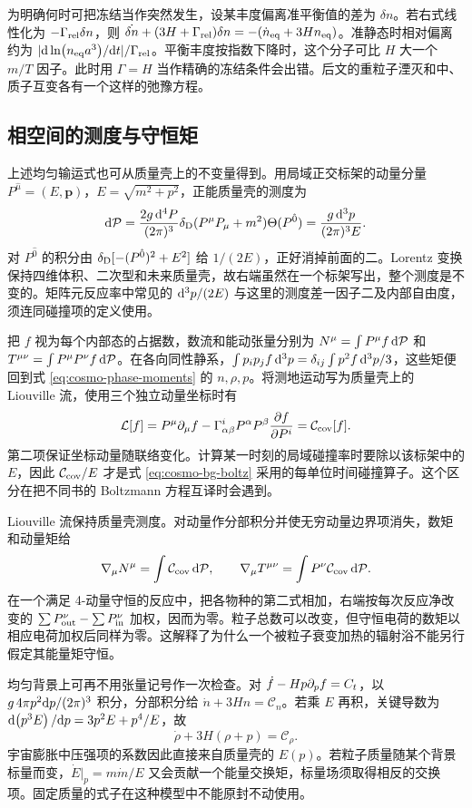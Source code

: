 为明确何时可把冻结当作突然发生，设某丰度偏离准平衡值的差为 $\delta n$。若右式线性化为 $-\Gamma_{\rm rel}\delta n$，则 $\dot{\delta n}+(3H+\Gamma_{\rm rel})\delta n=-(\dot n_{\rm eq}+3Hn_{\rm eq})$。准静态时相对偏离约为 $|\dd\ln(n_{\rm eq}a^3)/\dd t|/\Gamma_{\rm rel}$。平衡丰度按指数下降时，这个分子可比 $H$ 大一个 $m/T$ 因子。此时用 $\Gamma=H$ 当作精确的冻结条件会出错。后文的重粒子湮灭和中、质子互变各有一个这样的弛豫方程。

\subsection{相空间的测度与守恒矩}\label{sec:cosmo-kinetic-moments}

上述均匀输运式也可从质量壳上的不变量得到。用局域正交标架的动量分量 $P^{\hat\mu}=(E,\bm p)$，$E=\sqrt{m^2+p^2}$，正能质量壳的测度为
\[
 \dd\mathcal P=\frac{2g\,\dd^4P}{(2\pi)^3}
       \delta_{\rm D}(P^\mu P_\mu+m^2)\Theta(P^{\hat0})
       =\frac{g\,\dd^3p}{(2\pi)^3E}.
\]
对 $P^{\hat0}$ 的积分由 $\delta_{\rm D}[-(P^{\hat0})^2+E^2]$ 给 $1/(2E)$，正好消掉前面的二。Lorentz 变换保持四维体积、二次型和未来质量壳，故右端虽然在一个标架写出，整个测度是不变的。矩阵元反应率中常见的 $\dd^3p/(2E)$ 与这里的测度差一因子二及内部自由度，须连同碰撞项的定义使用。

把 $f$ 视为每个内部态的占据数，数流和能动张量分别为 $N^\mu=\int P^\mu f\,\dd\mathcal P$ 和 $T^{\mu\nu}=\int P^\mu P^\nu f\,\dd\mathcal P$。在各向同性静系，$\int p_i p_j f\,\dd^3p=\delta_{ij}\int p^2f\,\dd^3p/3$，这些矩便回到式 \eqref{eq:cosmo-phase-moments} 的 $n,\rho,p$。将测地运动写为质量壳上的 Liouville 流，使用三个独立动量坐标时有
\[
 \mathcal L[f]=P^\mu\partial_\mu f
   -\Gamma^i_{\alpha\beta}P^\alpha P^\beta
          \frac{\partial f}{\partial P^i}=\mathcal C_{\rm cov}[f].
\]
第二项保证坐标动量随联络变化。计算某一时刻的局域碰撞率时要除以该标架中的 $E$，因此 $\mathcal C_{\rm cov}/E$ 才是式 \eqref{eq:cosmo-bg-boltz} 采用的每单位时间碰撞算子。这个区分在把不同书的 Boltzmann 方程互译时会遇到。

Liouville 流保持质量壳测度。对动量作分部积分并使无穷动量边界项消失，数矩和动量矩给
\[
 \nabla_\mu N^\mu=\int\mathcal C_{\rm cov}\,\dd\mathcal P,\qquad
 \nabla_\mu T^{\mu\nu}=\int P^\nu\mathcal C_{\rm cov}\,\dd\mathcal P .
\]
在一个满足 4-动量守恒的反应中，把各物种的第二式相加，右端按每次反应净改变的 $\sum P_{\rm out}^\nu-\sum P_{\rm in}^\nu$ 加权，因而为零。粒子总数可以改变，但守恒电荷的数矩以相应电荷加权后同样为零。这解释了为什么一个被粒子衰变加热的辐射浴不能另行假定其能量矩守恒。

均匀背景上可再不用张量记号作一次检查。对 $\dot f-Hp\partial_p f=C_t$，以 $g\,4\pi p^2\dd p/(2\pi)^3$ 积分，分部积分给 $\dot n+3Hn=\mathcal C_n$。若乘 $E$ 再积，关键导数为 $\dd(p^3E)/\dd p=3p^2E+p^4/E$，故
\[
 \dot\rho+3H(\rho+p)=\mathcal C_\rho .
\]
宇宙膨胀中压强项的系数因此直接来自质量壳的 $E(p)$。若粒子质量随某个背景标量而变，$\dot E|_p=m\dot m/E$ 又会贡献一个能量交换矩，标量场须取得相反的交换项。固定质量的式子在这种模型中不能原封不动使用。

